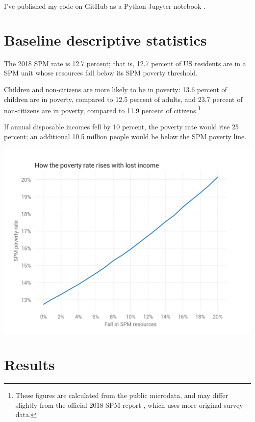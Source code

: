 \documentclass[12pt]{article}
\begin{document}
I've published my code on GitHub as a Python Jupyter notebook \cite{notebook}.


\section{Baseline descriptive statistics} \label{sec:baseline_descriptive_statistics}

The 2018 SPM rate is 12.7 percent; that is, 12.7 percent of US residents are in a SPM unit whose resources fall below its SPM poverty threshold.

Children and non-citizens are more likely to be in poverty: 13.6 percent of children are in poverty, compared to 12.5 percent of adults, and 23.7 percent of non-citizens are in poverty, compared to 11.9 percent of citizens.\footnote{These figures are calculated from the public microdata, and may differ slightly from the official 2018 SPM report \cite{spm}, which uses more original survey data.}

If annual disposable incomes fell by 10 percent, the poverty rate would rise 25 percent; an additional 10.5 million people would be below the SPM poverty line.

\begin{center}
\includegraphics[width=15cm]{charts/pov_rate_income.png}
\label{fig:poverty}
\end{center}


\section{Results} \label{sec:results}
\end{document}
